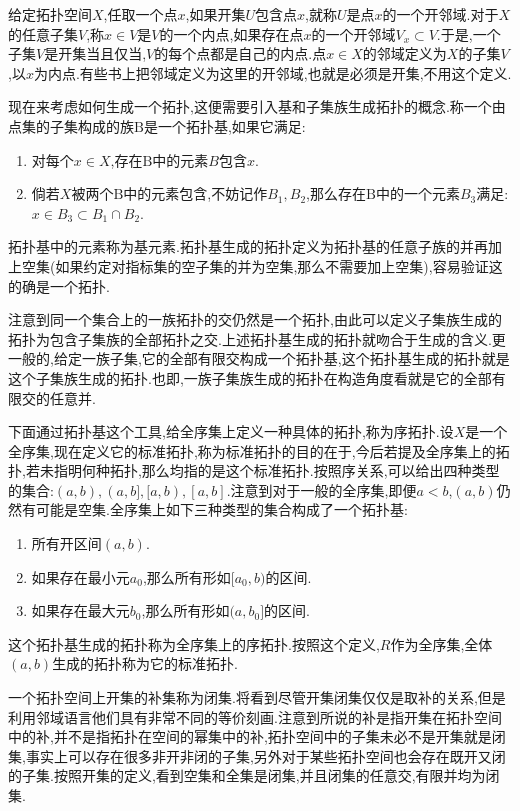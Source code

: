 给定拓扑空间$X$,任取一个点$x$,如果开集$U$包含点$x$,就称$U$是点$x$的一个开邻域.对于$X$的任意子集$V$,称$x\in V$是$V$的一个内点,如果存在点$x$的一个开邻域$V_x\subset V$.于是,一个子集$V$是开集当且仅当,$V$的每个点都是自己的内点.点$x\in X$的邻域定义为$X$的子集$V$,以$x$为内点.有些书上把邻域定义为这里的开邻域,也就是必须是开集,不用这个定义.

现在来考虑如何生成一个拓扑,这便需要引入基和子集族生成拓扑的概念.称一个由点集的子集构成的族$\mathrm{B}$是一个拓扑基,如果它满足:
\begin{enumerate}
	\item 对每个$x\in X$,存在$\mathrm{B}$中的元素$B$包含$x$.
	\item 倘若$X$被两个$\mathrm{B}$中的元素包含,不妨记作$B_1,B_2$,那么存在$\mathrm{B}$中的一个元素$B_3$满足:$x\in B_3\subset B_1\cap B_2$.
\end{enumerate}

拓扑基中的元素称为基元素.拓扑基生成的拓扑定义为拓扑基的任意子族的并再加上空集(如果约定对指标集的空子集的并为空集,那么不需要加上空集),容易验证这的确是一个拓扑.

注意到同一个集合上的一族拓扑的交仍然是一个拓扑,由此可以定义子集族生成的拓扑为包含子集族的全部拓扑之交.上述拓扑基生成的拓扑就吻合于生成的含义.更一般的,给定一族子集,它的全部有限交构成一个拓扑基,这个拓扑基生成的拓扑就是这个子集族生成的拓扑.也即,一族子集族生成的拓扑在构造角度看就是它的全部有限交的任意并.

下面通过拓扑基这个工具,给全序集上定义一种具体的拓扑,称为序拓扑.设$X$是一个全序集,现在定义它的标准拓扑,称为标准拓扑的目的在于,今后若提及全序集上的拓扑,若未指明何种拓扑,那么均指的是这个标准拓扑.按照序关系,可以给出四种类型的集合:$(a,b),(a,b],[a,b),[a,b]$.注意到对于一般的全序集,即便$a<b$,$(a,b)$仍然有可能是空集.全序集上如下三种类型的集合构成了一个拓扑基:
\begin{enumerate}
	\item 所有开区间$(a,b)$.
	\item 如果存在最小元$a_0$,那么所有形如$[a_0,b)$的区间.
	\item 如果存在最大元$b_0$,那么所有形如$(a,b_0]$的区间.
\end{enumerate}

这个拓扑基生成的拓扑称为全序集上的序拓扑.按照这个定义,$R$作为全序集,全体$(a,b)$生成的拓扑称为它的标准拓扑.

一个拓扑空间上开集的补集称为闭集.将看到尽管开集闭集仅仅是取补的关系,但是利用邻域语言他们具有非常不同的等价刻画.注意到所说的补是指开集在拓扑空间中的补,并不是指拓扑在空间的幂集中的补,拓扑空间中的子集未必不是开集就是闭集,事实上可以存在很多非开非闭的子集,另外对于某些拓扑空间也会存在既开又闭的子集.按照开集的定义,看到空集和全集是闭集,并且闭集的任意交,有限并均为闭集.

